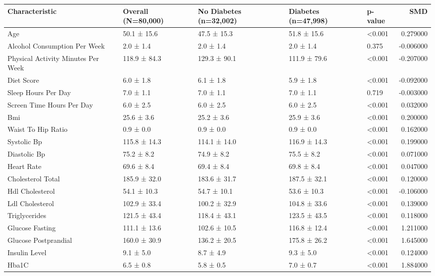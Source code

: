 \begin{tabular}{lllllr}
\toprule
Characteristic & Overall (N=80,000) & No Diabetes (n=32,002) & Diabetes (n=47,998) & p-value & SMD \\
\midrule
Age & 50.1 ± 15.6 & 47.5 ± 15.3 & 51.8 ± 15.6 & <0.001 & 0.279000 \\
Alcohol Consumption Per Week & 2.0 ± 1.4 & 2.0 ± 1.4 & 2.0 ± 1.4 & 0.375 & -0.006000 \\
Physical Activity Minutes Per Week & 118.9 ± 84.3 & 129.3 ± 90.1 & 111.9 ± 79.6 & <0.001 & -0.207000 \\
Diet Score & 6.0 ± 1.8 & 6.1 ± 1.8 & 5.9 ± 1.8 & <0.001 & -0.092000 \\
Sleep Hours Per Day & 7.0 ± 1.1 & 7.0 ± 1.1 & 7.0 ± 1.1 & 0.719 & -0.003000 \\
Screen Time Hours Per Day & 6.0 ± 2.5 & 6.0 ± 2.5 & 6.0 ± 2.5 & <0.001 & 0.032000 \\
Bmi & 25.6 ± 3.6 & 25.2 ± 3.6 & 25.9 ± 3.6 & <0.001 & 0.200000 \\
Waist To Hip Ratio & 0.9 ± 0.0 & 0.9 ± 0.0 & 0.9 ± 0.0 & <0.001 & 0.162000 \\
Systolic Bp & 115.8 ± 14.3 & 114.1 ± 14.0 & 116.9 ± 14.3 & <0.001 & 0.199000 \\
Diastolic Bp & 75.2 ± 8.2 & 74.9 ± 8.2 & 75.5 ± 8.2 & <0.001 & 0.071000 \\
Heart Rate & 69.6 ± 8.4 & 69.4 ± 8.4 & 69.8 ± 8.4 & <0.001 & 0.047000 \\
Cholesterol Total & 185.9 ± 32.0 & 183.6 ± 31.7 & 187.5 ± 32.1 & <0.001 & 0.120000 \\
Hdl Cholesterol & 54.1 ± 10.3 & 54.7 ± 10.1 & 53.6 ± 10.3 & <0.001 & -0.106000 \\
Ldl Cholesterol & 102.9 ± 33.4 & 100.2 ± 32.9 & 104.8 ± 33.6 & <0.001 & 0.139000 \\
Triglycerides & 121.5 ± 43.4 & 118.4 ± 43.1 & 123.5 ± 43.5 & <0.001 & 0.118000 \\
Glucose Fasting & 111.1 ± 13.6 & 102.6 ± 10.5 & 116.8 ± 12.4 & <0.001 & 1.211000 \\
Glucose Postprandial & 160.0 ± 30.9 & 136.2 ± 20.5 & 175.8 ± 26.2 & <0.001 & 1.645000 \\
Insulin Level & 9.1 ± 5.0 & 8.7 ± 4.9 & 9.3 ± 5.0 & <0.001 & 0.124000 \\
Hba1C & 6.5 ± 0.8 & 5.8 ± 0.5 & 7.0 ± 0.7 & <0.001 & 1.884000 \\
\bottomrule
\end{tabular}
